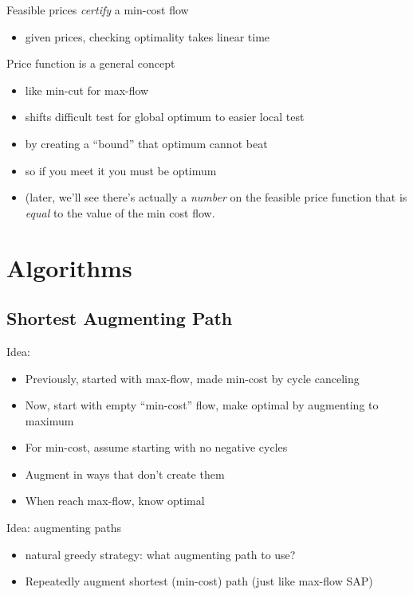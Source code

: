 \documentclass{article}
\begin{document}
Feasible prices \emph{certify} a min-cost flow
\begin{itemize}
  \item given prices, checking optimality takes linear time
\end{itemize}

Price function is a general concept
\begin{itemize}
\item like min-cut for max-flow
\item shifts difficult test for global optimum to easier local test
\item by creating a ``bound'' that optimum cannot beat
\item so if you meet it you must be optimum
\item (later, we'll see there's actually a \emph{number} on the
  feasible price function that is \emph{equal} to the value of the min
  cost flow.
\end{itemize}



\section*{Algorithms}


\subsection*{Shortest Augmenting Path}

Idea:
\begin{itemize}
\item Previously, started with max-flow, made min-cost by cycle
  canceling
\item Now, start with empty ``min-cost'' flow, make optimal by augmenting to
  maximum
\item For min-cost, assume starting with no negative cycles
\item Augment in ways that don't create them
\item When reach max-flow, know optimal
\end{itemize}

Idea: augmenting paths
\begin{itemize}
\item natural greedy strategy: what augmenting path to use?
\item Repeatedly augment shortest (min-cost) path (just like max-flow SAP)
\end{itemize}
\end{document}
